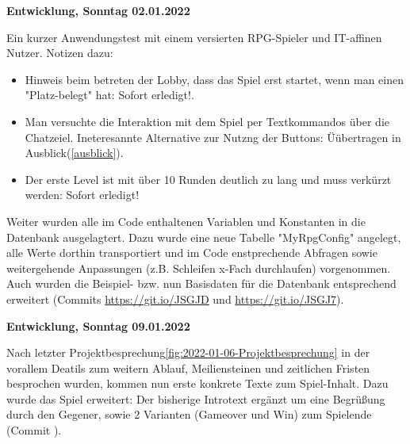 {            \textbf{Entwicklung, Sonntag 02.01.2022}

            Ein kurzer Anwendungstest mit einem versierten RPG-Spieler und IT-affinen Nutzer. Notizen dazu: 

            \begin{itemize}
                \item Hinweis beim betreten der Lobby, dass das Spiel erst startet, wenn man einen "Platz-belegt" hat: Sofort erledigt!. 
                \item Man versuchte die Interaktion mit dem Spiel per Textkommandos über die Chatzeiel. Ineteresannte Alternative zur Nutzng der Buttons: Üübertragen in Ausblick(\ref{ausblick}). 
                \item Der erste Level ist mit über 10 Runden deutlich zu lang und muss verkürzt werden: Sofort erledigt!
            \end{itemize}

            Weiter wurden alle im Code enthaltenen Variablen und Konstanten in die Datenbank ausgelagtert. Dazu wurde eine neue Tabelle "MyRpgConfig" angelegt, alle Werte dorthin transportiert und im Code enstprechende Abfragen sowie weitergehende Anpassungen (z.B. Schleifen x-Fach durchlaufen) vorgenommen. Auch wurden die Beispiel- bzw. nun Basisdaten für die Datenbank entsprechend erweitert (Commits \url{https://git.io/JSGJD} und \url{https://git.io/JSGJ7}).


            \textbf{Entwicklung, Sonntag 09.01.2022}

            Nach letzter Projektbesprechung\ref{fig:2022-01-06-Projektbesprechung} in der vorallem Deatils zum weitern Ablauf, Meiliensteinen und zeitlichen Fristen besprochen wurden, kommen nun erste konkrete Texte zum Spiel-Inhalt. Dazu wurde das Spiel erweitert: Der bisherige Introtext ergänzt um eine Begrüßung durch den Gegener, sowie 2 Varianten (Gameover und Win) zum Spielende (Commit \url{}).

}